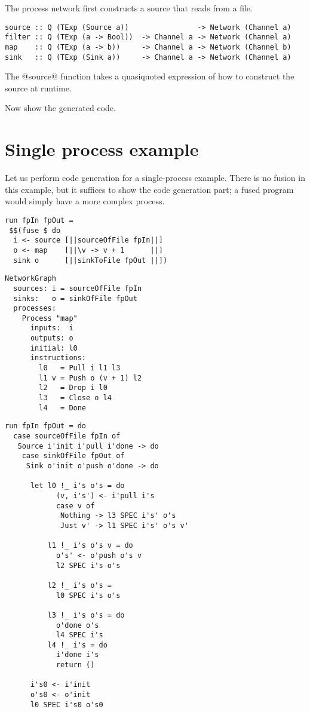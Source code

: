 The process network first constructs a source that reads from a file.
\begin{lstlisting}
source :: Q (TExp (Source a))                -> Network (Channel a)
filter :: Q (TExp (a -> Bool))  -> Channel a -> Network (Channel a)
map    :: Q (TExp (a -> b))     -> Channel a -> Network (Channel b)
sink   :: Q (TExp (Sink a))     -> Channel a -> Network (Channel a)
\end{lstlisting}
The @source@ function takes a quasiquoted expression of how to construct the source at runtime.

Now show the generated code.

\section{Single process example}
Let us perform code generation for a single-process example.
There is no fusion in this example, but it suffices to show the code generation part; a fused program would simply have a more complex process.

\begin{lstlisting}
run fpIn fpOut =
 $$(fuse $ do
  i <- source [||sourceOfFile fpIn||]
  o <- map    [||\v -> v + 1      ||]
  sink o      [||sinkToFile fpOut ||])
\end{lstlisting}

\begin{lstlisting}
NetworkGraph
  sources: i = sourceOfFile fpIn
  sinks:   o = sinkOfFile fpOut
  processes:
    Process "map"
      inputs:  i
      outputs: o
      initial: l0
      instructions:
        l0   = Pull i l1 l3
        l1 v = Push o (v + 1) l2
        l2   = Drop i l0
        l3   = Close o l4
        l4   = Done
\end{lstlisting}

\begin{lstlisting}
run fpIn fpOut = do
  case sourceOfFile fpIn of
   Source i'init i'pull i'done -> do
    case sinkOfFile fpOut of
     Sink o'init o'push o'done -> do

      let l0 !_ i's o's = do
            (v, i's') <- i'pull i's
            case v of
             Nothing -> l3 SPEC i's' o's
             Just v' -> l1 SPEC i's' o's v'

          l1 !_ i's o's v = do
            o's' <- o'push o's v
            l2 SPEC i's o's

          l2 !_ i's o's =
            l0 SPEC i's o's

          l3 !_ i's o's = do
            o'done o's
            l4 SPEC i's
          l4 !_ i's = do
            i'done i's
            return ()
      
      i's0 <- i'init
      o's0 <- o'init
      l0 SPEC i's0 o's0
\end{lstlisting}

